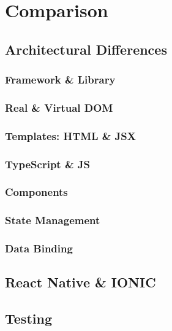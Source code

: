 
\chapter{Comparison} %
\label{Chapter5} %


\section{Architectural Differences}

\subsection{Framework \& Library}


\subsection{Real \& Virtual DOM}


\subsection{Templates: HTML \& JSX}


\subsection{TypeScript \& JS}


\subsection{Components}


\subsection{State Management}


\subsection{Data Binding}


\section{React Native \& IONIC}


\section{Testing}


